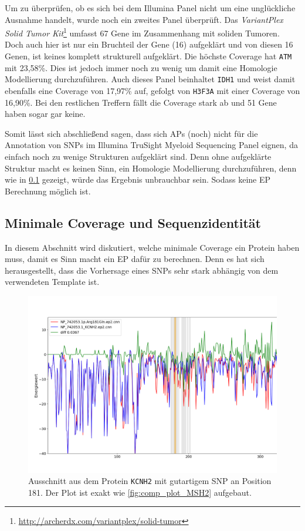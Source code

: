 Um zu überprüfen, ob es sich bei dem Illumina Panel nicht um eine unglückliche Ausnahme handelt, wurde noch ein zweites Panel überprüft. Das \emph{VariantPlex Solid Tumor Kit}\footnote{\url{http://archerdx.com/variantplex/solid-tumor}} umfasst 67 Gene im Zusammenhang mit soliden Tumoren. Doch auch hier ist nur ein Bruchteil der Gene (16) aufgeklärt und von diesen 16 Genen, ist keines komplett strukturell aufgeklärt. Die höchste Coverage hat \texttt{ATM} mit 23,58\%. Dies ist jedoch immer noch zu wenig um damit eine Homologie Modellierung durchzuführen. Auch dieses Panel beinhaltet \texttt{IDH1} und weist damit ebenfalls eine Coverage von 17,97\% auf, gefolgt von \texttt{H3F3A} mit einer Coverage von 16,90\%. Bei den restlichen Treffern fällt die Coverage stark ab und 51 Gene haben sogar gar keine.

Somit lässt sich abschließend sagen, dass sich \ac{APs} (noch) nicht für die Annotation von \ac{SNP}s im Illumina TruSight Myeloid Sequencing Panel eignen, da einfach noch zu wenige Strukturen aufgeklärt sind. Denn ohne aufgeklärte Struktur macht es keinen Sinn, ein Homologie Modellierung durchzuführen, denn wie in \ref{sec:min_coverage} gezeigt, würde das Ergebnis unbrauchbar sein. Sodass keine \ac{EP} Berechnung möglich ist. 


\subsection{Minimale Coverage und Sequenzidentität}
\label{sec:min_coverage}

In diesem Abschnitt wird diskutiert, welche minimale Coverage ein Protein haben muss, damit es Sinn macht ein \ac{EP} dafür zu berechnen. Denn es hat sich herausgestellt, dass die Vorhersage eines \ac{SNP}s sehr stark abhängig von dem verwendeten Template ist.

\begin{figure}
    \centering
    \includegraphics[width=.99\textwidth]{images/comp_plot_KCNH2_Arg181Gln.png}
    \caption{Ausschnitt aus dem Protein \texttt{KCNH2} mit gutartigem \ac{SNP} an Position 181. Der Plot ist exakt wie \ref{fig:comp_plot_MSH2} aufgebaut.}
    \label{fig:fail_ep}
\end{figure}

